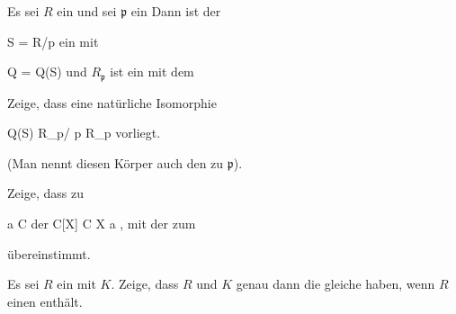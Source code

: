 {}
{





Es sei $R$ ein
und sei ${\mathfrak p}$ ein
Dann ist der

\mavergleichskette
{\vergleichskette
{S
}
{ = }{ R/{\mathfrak p}
}
{  }{
}
{    }{
}
{   }{
}
}
{}{}{}
ein
mit

\mavergleichskette
{\vergleichskette
{Q
}
{ = }{ Q(S)
}
{  }{
}
{    }{
}
{   }{
}
}
{}{}{}
und $R_{\mathfrak p}$ ist ein
mit dem

 Zeige, dass eine natürliche Isomorphie

\mavergleichskettedisp
{\vergleichskette
{ Q(S)
}
{ \cong} { R_{\mathfrak p}/ {\mathfrak p} R_{\mathfrak p}
}
{ } {
}
{ } {
}
{ } {
}
}
{}{}{}
vorliegt.





}
{(Man nennt diesen Körper auch den
 zu ${\mathfrak p}$).} {}

{}
{





Zeige, dass zu

\mavergleichskette
{\vergleichskette
{ a
}
{ \in }{ {\mathbb C}
}
{  }{
}
{    }{
}
{   }{
}
}
{}{}{}
der
\maabbeledisp {} { {\mathbb C}[X] } { {\mathbb C}
} { X } {a
} {,}
mit der
 {} {}
zum

 übereinstimmt.





}
{} {}

{}
{





Es sei $R$ ein
mit
$K$. Zeige, dass $R$ und $K$ genau dann die gleiche
haben, wenn $R$ einen
enthält.





}
{} {}

